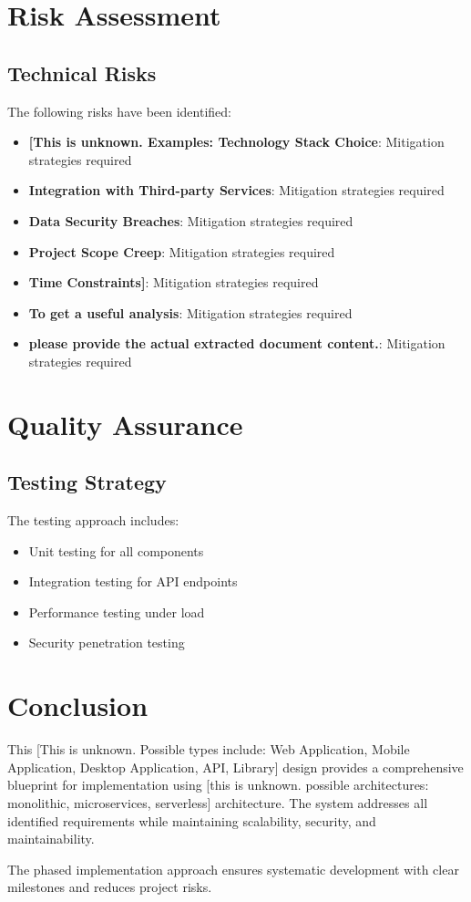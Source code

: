 \documentclass[11pt,a4paper,oneside]{article}
\begin{document}
\section{Risk Assessment}

\subsection{Technical Risks}

The following risks have been identified:
\begin{itemize}
\item \textbf{[This is unknown. Examples: Technology Stack Choice}: Mitigation strategies required
\item \textbf{Integration with Third-party Services}: Mitigation strategies required
\item \textbf{Data Security Breaches}: Mitigation strategies required
\item \textbf{Project Scope Creep}: Mitigation strategies required
\item \textbf{Time Constraints]}: Mitigation strategies required
\item \textbf{To get a useful analysis}: Mitigation strategies required
\item \textbf{please provide the actual extracted document content.}: Mitigation strategies required
\end{itemize}

\section{Quality Assurance}

\subsection{Testing Strategy}

The testing approach includes:
\begin{itemize}
\item Unit testing for all components
\item Integration testing for API endpoints
\item Performance testing under load
\item Security penetration testing
\end{itemize}

\section{Conclusion}

This [This is unknown.  Possible types include: Web Application, Mobile Application, Desktop Application, API, Library] design provides a comprehensive blueprint for implementation using [this is unknown.  possible architectures: monolithic, microservices, serverless] architecture. The system addresses all identified requirements while maintaining scalability, security, and maintainability.

The phased implementation approach ensures systematic development with clear milestones and reduces project risks.
\end{document}
